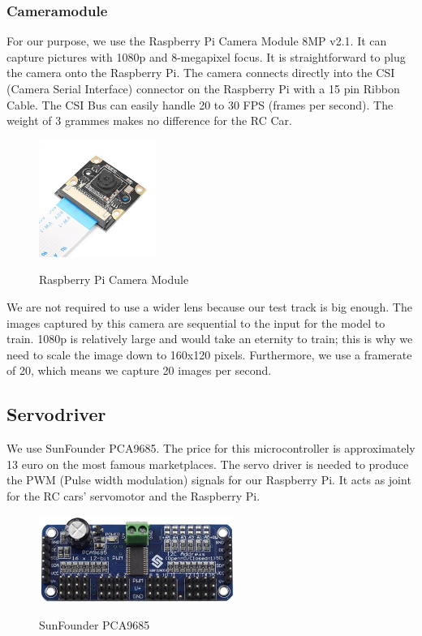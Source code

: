 \documentclass[journal]{IEEEtran}
\begin{document}
\subsubsection{Cameramodule}
\label{sec:cameramodule}
For our purpose, we use the Raspberry Pi Camera Module 8MP v2.1. It can capture pictures with 1080p and 8-megapixel focus. 
It is straightforward to plug the camera onto the Raspberry Pi. The camera connects directly into the CSI (Camera Serial Interface) connector on the Raspberry Pi with a 15 pin Ribbon Cable. The CSI Bus can easily handle 20 to 30 FPS (frames per second). The weight of 3 grammes makes no difference for the RC Car. \\
\begin{figure}
  \begin{center}
  \includegraphics[width=1.5in]{photo/camera.jpg}\\
  \caption{Raspberry Pi Camera Module}\label{camera}
  \end{center}
\end{figure}

We are not required to use a wider lens because our test track is big enough. The images captured by this camera are sequential to the input for the model to train. 1080p is relatively large and would take an eternity to train; this is why we need to scale the image down to 160x120 pixels. Furthermore, we use a framerate of 20, which means we capture 20 images per second.  

\subsection{Servodriver}
We use SunFounder PCA9685. The price for this microcontroller is approximately 13 euro on the most famous marketplaces. The servo driver is needed to produce the PWM (Pulse width modulation) signals for our Raspberry Pi. It acts as joint for the RC cars' servomotor and the Raspberry Pi. \\

\begin{figure}
  \begin{center}
  \includegraphics[width=2.5in]{photo/sunfounder.jpeg}\\
  \caption{SunFounder PCA9685}\label{servodriver}
  \end{center}
\end{figure}
\end{document}
